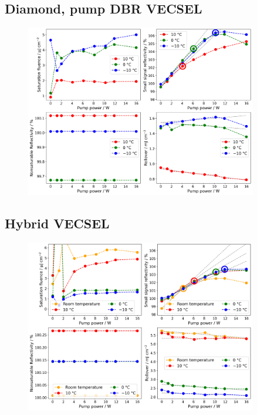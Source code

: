 



\newpage

\subsection{Diamond, pump DBR VECSEL}
\begin{figure}[ht]
    \centering
    \includegraphics[width=0.9\textwidth]{images/diamond-pump-DBR_paramfig.png}
\end{figure}





\newpage

\subsection{Hybrid VECSEL}
\begin{figure}[ht]
    \centering
    \includegraphics[width=0.9\textwidth]{images/hybrid_paramfig.png}
\end{figure}






